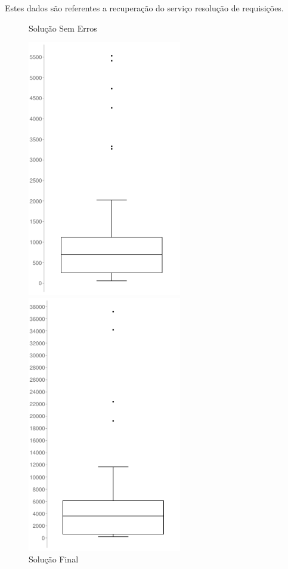 \documentclass[12pt]{article}
\begin{document}
Estes dados são referentes a recuperação do serviço resolução de requisições.

\begin{figure}[H]
    \begin{minipage}[H]{0.5\textwidth}
        \caption{Solução Sem Erros}
        \centering
        \includegraphics[width=0.6\textwidth]{picture/imagem4.png}
    \end{minipage}
    \begin{minipage}[H]{0.5\textwidth}
        \caption{Solução Final}
        \centering
        \includegraphics[width=0.6\textwidth]{picture/imagem3.png}
    \end{minipage}
\end{figure}    
\end{document}
